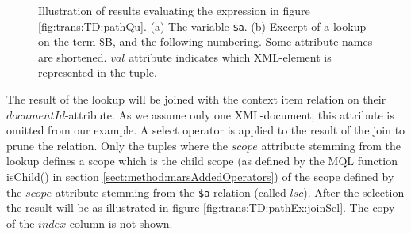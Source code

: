 \begin{myExample}
\begin{figure}[h]
\centering
{}
\qquad
{}
\caption[Evaluating the expression of figure \ref{fig:trans:TD:pathQu}]{Illustration of results evaluating the
expression in figure \ref{fig:trans:TD:pathQu}. (a) The variable \texttt{\$a}.
(b) Excerpt of a lookup on the term \textsf{\$B}, and the following numbering. Some attribute names are shortened. $val$ attribute indicates which
XML-element is represented in the tuple.
\label{fig:trans:TD:pathEx}}
\end{figure}

The result of the lookup will be joined with the context item relation on their $documentId$-attribute. As we
assume only one XML-document, this attribute is omitted from our example. A \textsf{select} operator is applied to
the result of the join to prune the relation. Only the tuples where the $scope$ attribute stemming from the lookup
defines a scope which is the child scope (as defined by the MQL function
\textsf{isChild()} in section \ref{sect:method:marsAddedOperators}) of the scope defined by the $scope$-attribute stemming from the
\texttt{\$a} relation (called $lsc$). After the selection the result will be as illustrated in figure
\ref{fig:trans:TD:pathEx:joinSel}. The copy of the $index$ column is not shown.


\end{myExample}
